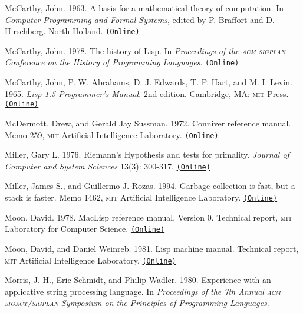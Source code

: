 \documentclass[8pt,oneside]{book}
\newcommand{\acronym}[1]{\textsc{\MakeLowercase{#1}}}
\newcommand{\code}[1]{\texttt{#1}}
\begin{document}
 \label{McCarthy 1963}
McCarthy, John.  1963.  A basis for a mathematical theory of computation.  In
\textit{Computer Programming and Formal Systems}, edited by P. Braffort and
D. Hirschberg.  North-Holland.
\href{http://innovation.it.uts.edu.au/projectjmc/articles/basis.html}{\code{(Online)}}

 \label{McCarthy 1978}
McCarthy, John.  1978.  The history of Lisp.  In \textit{Proceedings of the
\acronym{ACM} \acronym{SIGPLAN} Conference on the History of Programming
Languages}.
\href{http://innovation.it.uts.edu.au/projectjmc/articles/lisp.html}{\code{(Online)}}

 \label{McCarthy et al. 1965}
McCarthy, John, P. W. Abrahams, D. J. Edwards, T. P. Hart, and M. I.  Levin.
1965.  \textit{Lisp 1.5 Programmer's Manual}.  2nd edition.  Cambridge, MA:
\acronym{MIT} Press.
\href{http://www.softwarepreservation.org/projects/LISP/book/LISP\%201.5\%20Programmers\%20Manual.pdf/view}{\code{(Online)}}

 \label{McDermott and Sussman (1972)}
McDermott, Drew, and Gerald Jay Sussman.  1972. Conniver reference manual.
Memo 259, \acronym{MIT} Artificial Intelligence Laboratory.
\href{http://dspace.mit.edu/handle/1721.1/6203}{\code{(Online)}}

 \label{Miller 1976}
Miller, Gary L.  1976.  Riemann's Hypothesis and tests for primality.
\textit{Journal of Computer and System Sciences} 13(3): 300-317.
\href{http://www.cs.cmu.edu/~glmiller/Publications/b2hd-Mi76.html}{\code{(Online)}}

 \label{Miller and Rozas 1994}
Miller, James S., and Guillermo J. Rozas. 1994.  Garbage collection is fast,
but a stack is faster.  Memo 1462, \acronym{MIT} Artificial Intelligence
Laboratory.
\href{http://dspace.mit.edu/handle/1721.1/6622}{\code{(Online)}}

 \label{Moon 1978}
Moon, David.  1978.  MacLisp reference manual, Version 0.  Technical report,
\acronym{MIT} Laboratory for Computer Science.
\href{http://www.softwarepreservation.org/projects/LISP/MIT/Moon-MACLISP_Reference_Manual-Apr_08_1974.pdf/view}{\code{(Online)}}

 \label{Moon and Weinreb 1981}
Moon, David, and Daniel Weinreb.  1981.  Lisp machine manual.  Technical
report, \acronym{MIT} Artificial Intelligence Laboratory.
\href{http://www.unlambda.com/lmman/index.html}{\code{(Online)}}

 \label{Morris et al. 1980}
Morris, J. H., Eric Schmidt, and Philip Wadler.  1980.  Experience with an
applicative string processing language.  In \textit{Proceedings of the 7th Annual
\acronym{ACM} \acronym{SIGACT}/\acronym{SIGPLAN} Symposium on the Principles of
Programming Languages}.
\end{document}

